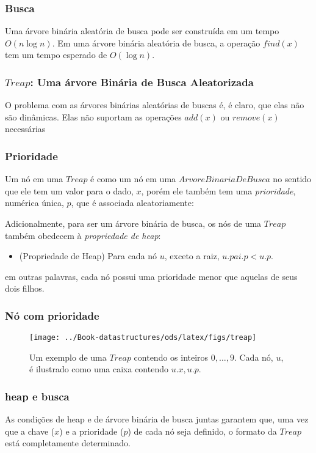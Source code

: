 \documentclass{beamer}
\newcommand{\figlabel}[1]{\label{fig:#1}}
\begin{document}
\begin{frame}
\frametitle{Busca}

Uma árvore binária aleatória de busca pode ser construída em um tempo $O(n\log n)$.
Em uma árvore binária aleatória de busca, a operação $find(x)$ tem um tempo esperado de $O(\log n)$.

\end{frame}

\begin{frame}
\frametitle{$Treap$: Uma árvore Binária de Busca Aleatorizada}
O problema com as árvores binárias aleatórias de buscas é, é claro, que elas não são
dinâmicas.  Elas não suportam as operações $add(x)$ ou $remove(x)$
necessárias

\end{frame}

\begin{frame}
\frametitle{Prioridade}
Um nó em uma $Treap$ é como um nó em uma $ArvoreBinariaDeBusca$ no sentido que
ele tem um valor para o dado, $x$, porém ele também tem uma \emph{prioridade},
numérica única, $p$, que é associada aleatoriamente:
\end{frame}

\begin{frame}
Adicionalmente, para ser um árvore binária de busca, os nós de uma $Treap$
também obedecem à \emph{propriedade de heap}:
\begin{itemize}
\item (Propriedade de Heap)  Para cada nó $u$, exceto a raiz, 
      $u.pai.p < u.p$.
\end{itemize}
em outras palavras, cada nó possui uma prioridade menor que aquelas de seus dois filhos.

\end{frame}

\begin{frame}
\frametitle{Nó com prioridade}
\begin{figure}
  \begin{center}
    \texttt{[image: ../Book-datastructures/ods/latex/figs/treap]}
  \end{center}
  \caption[Uma Treap]{Um exemplo de uma $Treap$ contendo os inteiros
  $0,\ldots,9$. Cada nó, $u$, é ilustrado como uma caixa contendo $u.x,u.p$.}
  \figlabel{treap}
\end{figure}

\end{frame}

\begin{frame}
\frametitle{heap e busca}
As condições de heap e de árvore binária de busca juntas garantem que, uma vez
que a chave ($x$) e a prioridade ($p$) de cada nó seja definido, o formato
da $Treap$ está completamente determinado. 
\end{frame}
\end{document}

